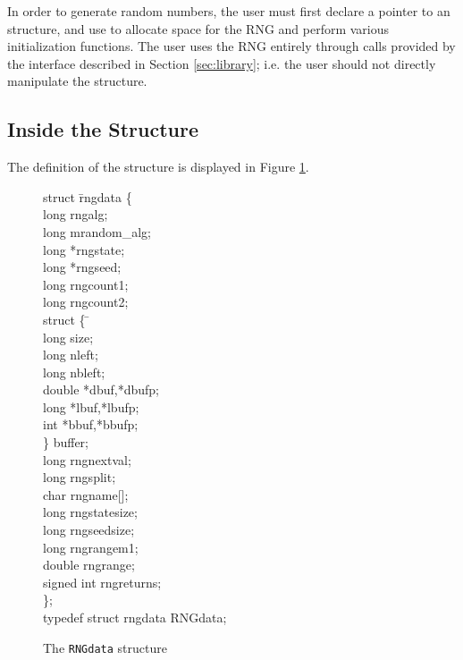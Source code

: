 In order to generate random numbers, the user must first declare a
pointer to an  structure, and use  to
allocate space for the RNG and perform various initialization functions.
The user uses the RNG entirely through calls provided by the interface
described in Section \ref{sec:library}; i.e. the user should not
directly manipulate the  structure.

\subsection{Inside the Structure}
	The definition of the  structure is displayed in
Figure \ref{fig:rngdata}.

\begin{figure}
\begin{example}
\begin{tabbing}
struct \= rngdata \{ \+ \\
long rngalg;\\
long mrandom_alg;\\
long *rngstate;\\
long *rngseed;\\
long rngcount1;\\
long rngcount2;\\
struct \{ \= \+ \\
long size;\\
long nleft;\\
long nbleft;\\
double *dbuf,*dbufp;\\
long *lbuf,*lbufp;\\
int *bbuf,*bbufp;\\
\} buffer; \- \\
long rngnextval;\\
long rngsplit;\\
char rngname[];\\
long rngstatesize;\\
long rngseedsize;\\
long rngrangem1;\\
double rngrange;\\
signed int rngreturns; \- \\
\}; \\
typedef struct rngdata RNGdata;
\end{tabbing}
\end{example}
\caption{The {\tt RNGdata} structure}
\label{fig:rngdata}
\end{figure}

